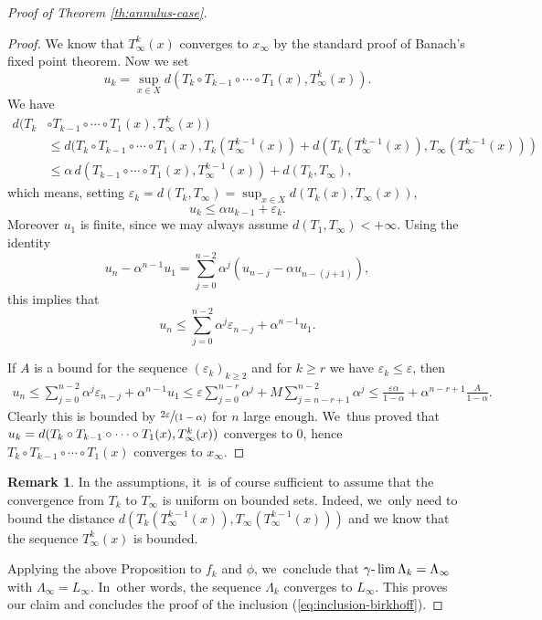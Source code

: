 \documentclass[JEP,XML,SOM,Unicode,NoFloatCountersInSection,published]{cedram}
\newcommand{\spfrac}[2]{\sfrac{#1}{(#2)}}
\theoremstyle{definition}
\newtheorem{rem}[thm]{Remark}
\begin{document}
\begin{proof}[Proof of Theorem \ref{th:annulus-case}]
\begin{proof}
We know that $T_{\infty}^{k}(x)$ converges to $x_{\infty}$ by the standard proof of Banach's fixed point theorem. Now we set
\[
u_{k}= \sup_{x\in X} d(T_{k}\circ T_{k-1}\circ \cdots \circ T_{1}(x), T_\infty^{k}(x)).
\]
We have
\begin{align*}
d(T_{k}&\circ T_{k-1}\circ \cdots \circ T_{1}(x),T_\infty^{k}(x)) \\
&\leq d(T_{k}\circ T_{k-1}\circ \cdots \circ T_{1}(x), T_{k}(T_\infty^{k-1}(x))+d (T_{k}(T_\infty^{k-1}(x)), T_\infty(T_\infty^{k-1}(x))) \\ &\leq
\alpha\, d(T_{k-1}\circ \cdots \circ T_{1}(x),T_\infty^{k-1}(x)) + d(T_{k}, T_\infty),
\end{align*}
which means, setting $ \varepsilon_{k}=d(T_{k},T_{\infty})=\sup_{x\in X}d(T_{k}(x),T_{\infty}(x))$,
\[
u_{k}\leq \alpha u_{k-1}+\varepsilon_{k}.
\]
Moreover $u_1$ is finite, since we may always assume $d(T_1,T_\infty)<+\infty$.
Using the identity
\[
u_{n}- \alpha^{n-1}u_{1}= \sum_{j=0}^{n-2} \alpha^{j}(u_{n-j}-\alpha u_{n-(j+1)}),
\]
this implies that
\[
u_{n}\leq \sum_{j=0}^{n-2} \alpha^{j} \varepsilon_{n-j}+ \alpha^{n-1}u_{1}.
\]

If $A$ is a bound for the sequence $(\varepsilon_k)_{k\geq 2}$ and for $k\geq r$ we have $ \varepsilon _{k}\leq \varepsilon $, then
\begin{gather*}u_{n}\leq \sum_{j=0}^{n-2} \alpha^{j} \varepsilon_{n-j} +\alpha^{n-1}u_{1}\leq \varepsilon \sum_{j=0}^{n-r}\alpha^{j}+ M\sum_{j=n-r+1}^{n-2}\alpha^{j}\leq \frac{ \varepsilon \alpha}{1- \alpha}+ \alpha^{n-r+1} \frac{A}{1-\alpha}.
\end{gather*}
Clearly this is bounded by $ \spfrac{2 \varepsilon}{1- \alpha}$ for $n$ large enough. We~thus proved that $u_{k}=d(T_{k}\circ\nobreak T_{k-1}\circ \cdots \circ T_{1}(x),T_\infty^{k}(x))$ converges to $0$, hence $T_{k}\circ T_{k-1}\circ \cdots \circ T_{1}(x)$ converges to $x_{\infty}$.
\end{proof}
\begin{rem}
In the assumptions, it~is of course sufficient to assume that the convergence from $T_{k}$ to $T_{\infty}$ is uniform on bounded sets. Indeed, we~only need to bound the distance $d(T_{k}(T_{\infty}^{k-1}(x)), T_{\infty}(T_{\infty}^{k-1}(x)))$ and we know that the sequence $ T_{\infty}^{k}(x)$ is bounded.
\end{rem}

Applying the above Proposition to $f_{k}$ and $\phi$, we~conclude that $\gamma\textup{-}\lim \Lambda_{k}=\Lambda_\infty$ with $\Lambda_\infty=L_\infty$. In~other words, the sequence $\Lambda_k$ converges to $L_\infty$. This proves our claim and concludes the proof of the inclusion (\ref{eq:inclusion-birkhoff}).


\end{proof}
\end{document}

